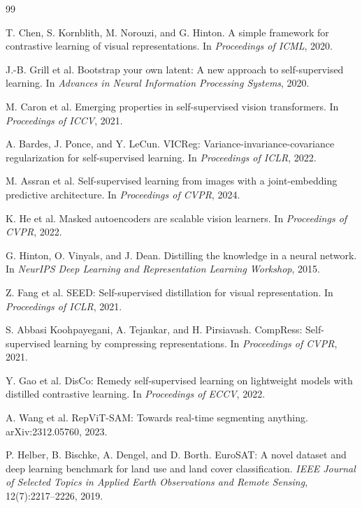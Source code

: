 \documentclass[10pt]{article}
\begin{document}
\begin{thebibliography}{99}
\small

T. Chen, S. Kornblith, M. Norouzi, and G. Hinton.
\newblock A simple framework for contrastive learning of visual representations.
\newblock In \emph{Proceedings of ICML}, 2020.

J.-B. Grill et al.
\newblock Bootstrap your own latent: A new approach to self-supervised learning.
\newblock In \emph{Advances in Neural Information Processing Systems}, 2020.

M. Caron et al.
\newblock Emerging properties in self-supervised vision transformers.
\newblock In \emph{Proceedings of ICCV}, 2021.

A. Bardes, J. Ponce, and Y. LeCun.
\newblock VICReg: Variance-invariance-covariance regularization for self-supervised learning.
\newblock In \emph{Proceedings of ICLR}, 2022.

M. Assran et al.
\newblock Self-supervised learning from images with a joint-embedding predictive architecture.
\newblock In \emph{Proceedings of CVPR}, 2024.

K. He et al.
\newblock Masked autoencoders are scalable vision learners.
\newblock In \emph{Proceedings of CVPR}, 2022.

G. Hinton, O. Vinyals, and J. Dean.
\newblock Distilling the knowledge in a neural network.
\newblock In \emph{NeurIPS Deep Learning and Representation Learning Workshop}, 2015.

Z. Fang et al.
\newblock SEED: Self-supervised distillation for visual representation.
\newblock In \emph{Proceedings of ICLR}, 2021.

S. Abbasi Koohpayegani, A. Tejankar, and H. Pirsiavash.
\newblock CompRess: Self-supervised learning by compressing representations.
\newblock In \emph{Proceedings of CVPR}, 2021.

Y. Gao et al.
\newblock DisCo: Remedy self-supervised learning on lightweight models with distilled contrastive learning.
\newblock In \emph{Proceedings of ECCV}, 2022.

A. Wang et al.
\newblock RepViT-SAM: Towards real-time segmenting anything.
\newblock arXiv:2312.05760, 2023.

P. Helber, B. Bischke, A. Dengel, and D. Borth.
\newblock EuroSAT: A novel dataset and deep learning benchmark for land use and land cover classification.
\newblock \emph{IEEE Journal of Selected Topics in Applied Earth Observations and Remote Sensing}, 12(7):2217--2226, 2019.

\end{thebibliography}
\end{document}
